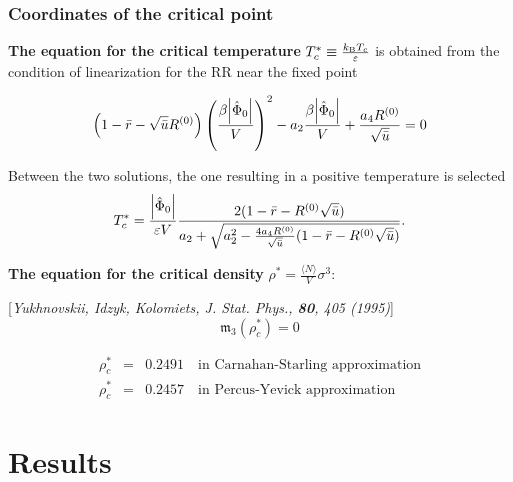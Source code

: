 \documentclass[8pt]{beamer}
\begin{document}
	\begin{frame}
		\frametitle{Coordinates of the critical point}
		
		\textbf{The equation for the critical temperature} $T_c^* \equiv \frac{k_{{\rm B}}T_c}{\varepsilon}$  is obtained from the condition of linearization for the RR near the fixed point
		
		\begin{equation*}
			\left(1 - \bar{r} - \sqrt{\bar{u}}R^{(0)}\right) \left(\frac{\beta\abs{\hat{\Phi}_0}}{V}\right)^2 - a_2\frac{\beta\abs{\hat{\Phi}_0}}{V} + \frac{a_4 R^{(0)}}{\sqrt{\bar{u}}} = 0
		\end{equation*}
		
		Between the two solutions, the one resulting in a positive temperature is selected
		\begin{equation*}
			\label{eq:T_c}
			T^*_c = \frac{\abs{\hat{\Phi}_0}}{\varepsilon V}
			\frac
			{2(1 - \bar{r} - R^{(0)}\sqrt{\bar{u}})}
			{a_2 + \sqrt{a_2^2 - \frac{4 a_4 R^{(0)}}{\sqrt{\bar{u}}} (1 - \bar{r} - R^{(0)}\sqrt{\bar{u}}) } }.
		\end{equation*}
		
		\textbf{The equation for the critical density} $\rho^*=\frac{\langle N \rangle}{V}\sigma^3$:
		
		[\textit{Yukhnovskii, Idzyk, Kolomiets, J. Stat. Phys., \textbf{80}, 405 (1995)}]
		\begin{equation*}
			\mathfrak{m}_3(\rho^*_c) = 0 
		\end{equation*}
		
		\begin{eqnarray*}
			\rho^*_c & = & 0.2491 \quad \text{in Carnahan-Starling approximation}
			\\
			\rho^*_c & = & 0.2457 \quad \text{in Percus-Yevick approximation}
		\end{eqnarray*}
	\end{frame}
	
	\section{Results}
	
\end{document}
